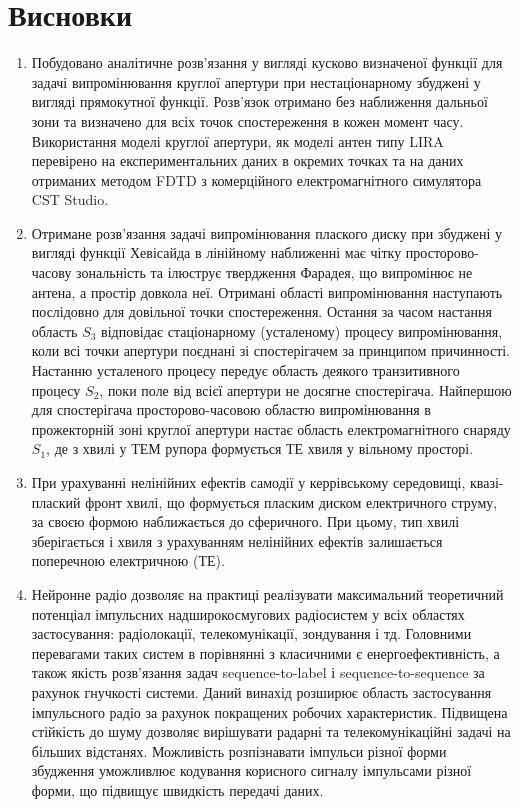 \chapter*{Висновки}

\begin{enumerate}

\item Побудовано аналітичне розв'язання у вигляді кусково визначеної функції для 
задачі випромінювання круглої апертури при нестаціонарному збуджені у вигляді 
прямокутної функції. Розв'язок отримано без наближення дальньої зони та визначено 
для всіх точок спостереження в кожен момент часу. Використання моделі круглої 
апертури, як моделі антен типу LIRA перевірено на експериментальних даних в 
окремих точках та на даних отриманих методом FDTD з комерційного електромагнітного 
симулятора CST Studio.

\item Отримане розв'язання задачі випромінювання плаского диску при збуджені у 
вигляді функції Хевісайда в лінійному наближенні має чітку просторово-часову 
зональність та ілюструє твердження Фарадея, що випромінює не антена, а простір 
довкола неї. Отримані області випромінювання наступають послідовно для довільної 
точки спостереження. Остання за часом настання область $ S_3 $ відповідає 
стаціонарному (усталеному) процесу випромінювання, коли всі точки апертури 
поєднані зі спостерігачем за принципом причинності. Настанню усталеного процесу 
передує область деякого транзитивного процесу $ S_2 $, поки поле від всієї 
апертури не досягне спостерігача. Найпершою для спостерігача просторово-часовою 
областю випромінювання в прожекторній зоні круглої апертури настає область 
електромагнітного снаряду $ S_1 $, де з хвилі у ТЕМ рупора формується ТЕ хвиля 
у вільному просторі.

\item При урахуванні нелінійних ефектів самодії у керрівському середовищі, 
квазі-плаский фронт хвилі, що формується пласким диском електричного струму, 
за своєю формою наближається до сферичного. При цьому, тип хвилі зберігається і
хвиля з урахуванням нелінійних ефектів залишається поперечною електричною (ТЕ). 

\item Нейронне радіо дозволяє на практиці реалізувати максимальний теоретичний
потенціал імпульсних надширокосмугових радіосистем у всіх областях застосування:  
радіолокації, телекомунікації, зондування і тд. Головними перевагами таких систем 
в порівнянні з класичними є енергоефективність, а також якість розв'язання задач 
sequence-to-label і sequence-to-sequence за рахунок гнучкості системи.
Даний винахід розширює область застосування імпульсного радіо за 
рахунок покращених робочих характеристик. Підвищена стійкість до 
шуму дозволяє вирішувати радарні та телекомунікаційні задачі на 
більших відстанях. Можливість розпізнавати імпульси різної форми 
збудження уможливлює кодування корисного сигналу імпульсами різної форми, 
що підвищує швидкість передачі даних. 

\end{enumerate}
